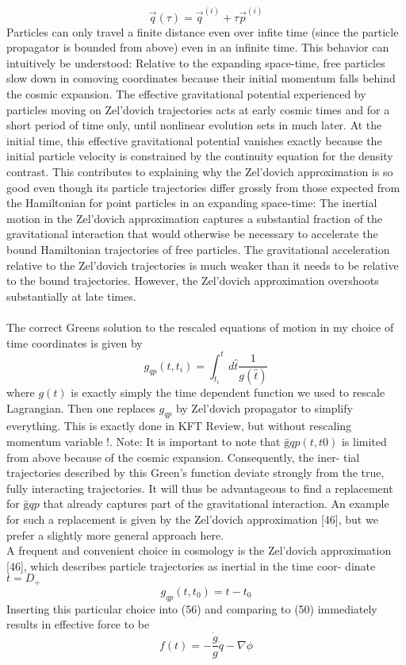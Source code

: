 \begin{description}
\begin{equation*}
\vec{q}(\tau) = \vec{q}^{(i)} + \tau \vec{p}^{(i)}
\end{equation*}Particles can only travel a finite distance even over infite time (since the particle propagator
is bounded from above) even in an infinite time. This behavior can intuitively be
understood: Relative to the expanding space-time, free
particles slow down in comoving coordinates because their
initial momentum falls behind the cosmic expansion.
The effective gravitational potential experienced by
particles moving on Zel’dovich trajectories acts at
early cosmic times and for a short period of time
only, until nonlinear evolution sets in much later. At
the initial time, this effective gravitational potential
vanishes exactly because the initial particle velocity
is constrained by the continuity equation for the
density contrast. This contributes to explaining why
the Zel’dovich approximation is so good even
though its particle trajectories differ grossly from
those expected from the Hamiltonian for point
particles in an expanding space-time: The inertial
motion in the Zel’dovich approximation captures a
substantial fraction of the gravitational interaction
that would otherwise be necessary to accelerate the
bound Hamiltonian trajectories of free particles. The
gravitational acceleration relative to the Zel’dovich
trajectories is much weaker than it needs to be
relative to the bound trajectories.
However, the Zel’dovich approximation overshoots
substantially at late times.
\\
\\
The correct Greens solution to the rescaled equations of motion in my choice of time coordinates is given by 
\[ g_{qp}(t,t_i) = \int_{t_i}^{t} d\hat{t} \frac{1}{g(\hat{t})}\]
where $g(t)$ is exactly simply the time dependent function we used to rescale Lagrangian. Then one replaces $g_{qp}$ by Zel'dovich propagator to simplify everything. This is exactly done in KFT Review, but without rescaling momentum variable !. Note: 
It is important to note that $ḡ q p (t , t 0 )$ is limited from above
because of the cosmic expansion. Consequently, the iner-
tial trajectories described by this Green’s function deviate
strongly from the true, fully interacting trajectories. It will
thus be advantageous to find a replacement for $ḡ q p$ that
already captures part of the gravitational interaction. An
example for such a replacement is given by the Zel’dovich
approximation [46], but we prefer a slightly more general
approach here.\\
A frequent and convenient choice
in cosmology is the Zel’dovich approximation [46], which
describes particle trajectories as inertial in the time coor-
dinate $t = D_+$ 
\begin{equation*}
	g_{qp}(t,t_0)=t-t_0
\end{equation*}
Inserting this particular choice into (56) and comparing
to (50) immediately results in effective force to be 
\[ f(t) = - \frac{\dot{g}}{g} \dot{q} - \nabla \phi \]\\
\\


\end{description}
